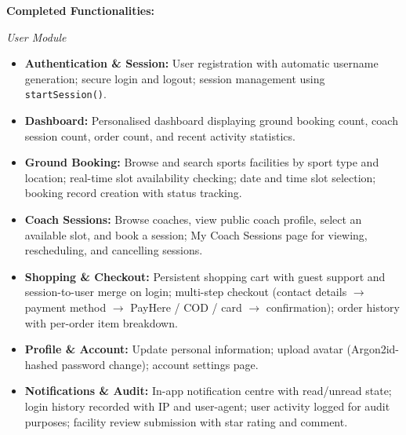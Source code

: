 \documentclass[12pt,a4paper]{report}
\begin{document}
\textbf{Completed Functionalities:}

\textit{User Module}
\begin{itemize}[leftmargin=1.5cm]
  \item \textbf{Authentication \& Session:} User registration with automatic username generation; secure login and logout; session management using \texttt{startSession()}.
  \item \textbf{Dashboard:} Personalised dashboard displaying ground booking count, coach session count, order count, and recent activity statistics.
  \item \textbf{Ground Booking:} Browse and search sports facilities by sport type and location; real-time slot availability checking; date and time slot selection; booking record creation with status tracking.
  \item \textbf{Coach Sessions:} Browse coaches, view public coach profile, select an available slot, and book a session; My Coach Sessions page for viewing, rescheduling, and cancelling sessions.
  \item \textbf{Shopping \& Checkout:} Persistent shopping cart with guest support and session-to-user merge on login; multi-step checkout (contact details $\to$ payment method $\to$ PayHere / COD / card $\to$ confirmation); order history with per-order item breakdown.
  \item \textbf{Profile \& Account:} Update personal information; upload avatar (Argon2id-hashed password change); account settings page.
  \item \textbf{Notifications \& Audit:} In-app notification centre with read/unread state; login history recorded with IP and user-agent; user activity logged for audit purposes; facility review submission with star rating and comment.
\end{itemize}
\end{document}
